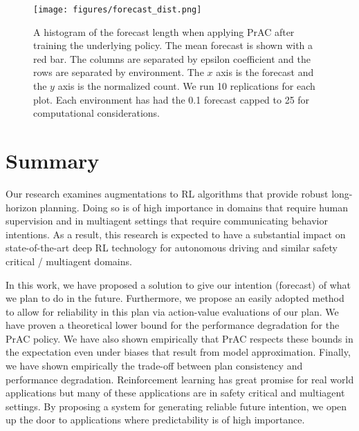 \documentclass[letterpaper]{article} %
\begin{document}



            \begin{figure}[!h]
                \texttt{[image: figures/forecast\_dist.png]}
                \caption{A histogram of the forecast length when applying  PrAC after training the underlying policy. The mean forecast is shown with a red bar. The columns are separated by epsilon coefficient and the rows are separated by environment. The $x$ axis is the forecast and the $y$ axis is the normalized count. We run 10 replications for each plot. Each environment has had the 0.1 forecast capped to 25 for computational considerations.}
                \label{forecast-dist}
            \end{figure}


    \section{Summary}
        Our research examines augmentations to RL algorithms that provide robust long-horizon planning. Doing so is of high importance in domains that require human supervision and in multiagent settings that require communicating behavior intentions. As a result, this research is expected to have a substantial impact on state-of-the-art deep RL technology for autonomous driving and similar safety critical / multiagent domains.

        In this work, we have proposed a solution to give our intention (forecast) of what we plan to do in the future. Furthermore, we propose an easily adopted method to allow for reliability in this plan via action-value evaluations of our plan. We have proven a theoretical lower bound for the performance degradation for the PrAC policy. We have also shown empirically that PrAC respects these bounds in the expectation even under biases that result from model approximation. Finally, we have shown empirically the trade-off between plan consistency and performance degradation. Reinforcement learning has great promise for real world applications but many of these applications are in safety critical and multiagent settings. By proposing a system for generating reliable future intention, we open up the door to applications where predictability is of high importance.


    
\end{document}
